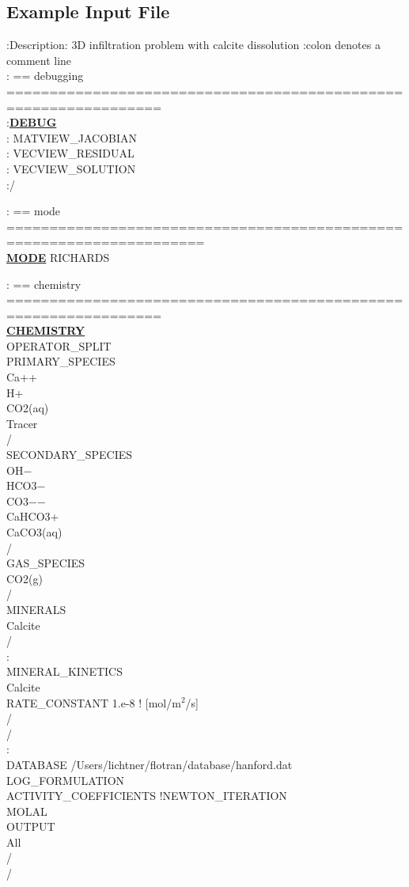 \documentclass[12pt]{article}
\begin{document}
\clearpage

\subsection{Example Input File}

\hypertarget{target_input_file}{}

\footnotesize
:Description: 3D infiltration problem with calcite dissolution
:colon denotes a comment line\\

\noindent
: == debugging ================================================================\\
:\hyperlink{target_dbg}{\bf DEBUG}\\
:  MATVIEW\_JACOBIAN\\
:  VECVIEW\_RESIDUAL\\
:  VECVIEW\_SOLUTION\\
:/

\noindent
: == mode =====================================================================\\
\hyperlink{target_mode}{\bf MODE} RICHARDS

\noindent
: == chemistry ================================================================\\
\hyperlink{target_chem}{\bf CHEMISTRY}\\
OPERATOR\_SPLIT\\
PRIMARY\_SPECIES\\
  Ca++\\
  H+\\
  CO2(aq)\\
  Tracer\\
/\\
SECONDARY\_SPECIES\\
  OH$-$\\
  HCO3$-$\\
  CO3$-$$-$\\
  CaHCO3+\\
  CaCO3(aq)\\
/\\
GAS\_SPECIES\\
  CO2(g)\\
/\\
MINERALS\\
  Calcite\\
/\\
:\\
MINERAL\_KINETICS\\
Calcite\\
RATE\_CONSTANT 1.e-8 ! [mol/m$^2$/s]\\
/\\
/\\
:\\
DATABASE /Users/lichtner/flotran/database/hanford.dat\\
LOG\_FORMULATION\\
ACTIVITY\_COEFFICIENTS !NEWTON\_ITERATION\\
MOLAL\\
OUTPUT\\
All\\
/\\
/
\end{document}
